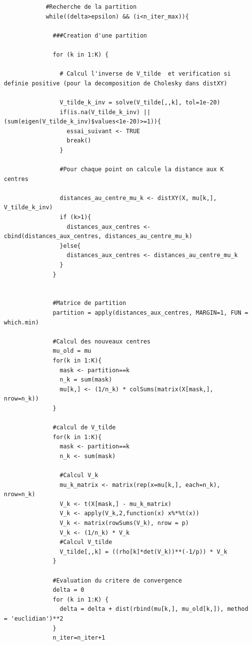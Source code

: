 \documentclass[a4paper,11pt,oneside,roman]{article}
\begin{document}
\begin{lstlisting}
            #Recherche de la partition
            while((delta>epsilon) && (i<n_iter_max)){
              
              ###Creation d'une partition
              
              for (k in 1:K) {
                
                # Calcul l'inverse de V_tilde  et verification si definie positive (pour la decomposition de Cholesky dans distXY)
                
                V_tilde_k_inv = solve(V_tilde[,,k], tol=1e-20)
                if(is.na(V_tilde_k_inv) || (sum(eigen(V_tilde_k_inv)$values<1e-20)>=1)){
                  essai_suivant <- TRUE
                  break()
                }
                
                #Pour chaque point on calcule la distance aux K centres
                
                distances_au_centre_mu_k <- distXY(X, mu[k,], V_tilde_k_inv) 
                if (k>1){
                  distances_aux_centres <- cbind(distances_aux_centres, distances_au_centre_mu_k)
                }else{
                  distances_aux_centres <- distances_au_centre_mu_k
                }
              }
            
              
              #Matrice de partition
              partition = apply(distances_aux_centres, MARGIN=1, FUN = which.min)
              
              #Calcul des nouveaux centres
              mu_old = mu
              for(k in 1:K){
                mask <- partition==k
                n_k = sum(mask)
                mu[k,] <- (1/n_k) * colSums(matrix(X[mask,], nrow=n_k))
              }
              
              #calcul de V_tilde
              for(k in 1:K){
                mask <- partition==k
                n_k <- sum(mask)
                
                #Calcul V_k
                mu_k_matrix <- matrix(rep(x=mu[k,], each=n_k), nrow=n_k)
                V_k <- t(X[mask,] - mu_k_matrix)
                V_k <- apply(V_k,2,function(x) x%*%t(x))
                V_k <- matrix(rowSums(V_k), nrow = p)
                V_k <- (1/n_k) * V_k
                #Calcul V_tilde
                V_tilde[,,k] = ((rho[k]*det(V_k))**(-1/p)) * V_k
              }
            
              #Evaluation du critere de convergence
              delta = 0
              for (k in 1:K) {
                delta = delta + dist(rbind(mu[k,], mu_old[k,]), method = 'euclidian')**2
              }
              n_iter=n_iter+1
              

\end{lstlisting}
\end{document}
